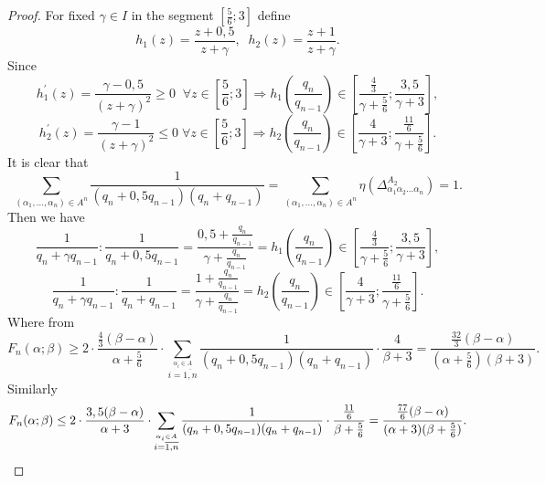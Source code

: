 \documentclass[11pt]{amsart}
\theoremstyle{plain}
\theoremstyle{remark}
\begin{document}
\begin{proof}
   For fixed $\gamma \in I$ in the segment $[\frac{5}{6};3]$ define
    $$h_{1}(z)=\frac{z+0,5}{z+\gamma},\;\;  h_{2}(z)=\frac{z+1}{z+\gamma}.$$
   Since
   $$h_{1}^\prime(z)=\frac{\gamma-0,5}{(z+\gamma)^2}\geq 0\;\; \forall z\in [\frac{5}{6};3]  \Rightarrow   h_{1}(\frac{q_{n}}{q_{n-1}})\in\left[\frac{ \frac{4}{3}}{\gamma+\frac{5}{6}};\frac{3,5}{\gamma+3}\right],$$
    $$h_{2}^\prime(z)=\frac{\gamma-1}{(z+\gamma)^2}\leq 0\; \forall z\in [\frac{5}{6};3] \Rightarrow   h_{2}(\frac{q_{n}}{q_{n-1}})\in\left[\frac{4}{\gamma+3};\frac{\frac{11}{6}}{\gamma+\frac{5}{6}}\right].$$
   It is clear that
    $$\sum_{(\alpha_1,...,\alpha_n)\in A^n}\frac{1}{(q_n+0,5q_{n-1})(q_n+q_{n-1})}=\sum_{(\alpha_1,...,\alpha_n)\in A^n}\eta(\Delta^{A_2}_{\alpha_1\alpha_2...\alpha_n})=1.$$
   Then we have
   $$
   \frac{1}{q_n+\gamma q_{n-1}}: \frac{1}{q_n+0,5 q_{n-1}}=\frac{0,5+\frac{q_{n}}{q_{n-1}}}{\gamma+\frac{q_{n}}{q_{n-1}}}=h_{1}\left(\frac{q_{n}}{q_{n-1}}\right)
    \in\left[\frac{ \frac{4}{3}}{\gamma+\frac{5}{6}};\frac{3,5}{\gamma+3}\right],
   $$
   $$
   \frac{1}{q_n+\gamma q_{n-1}}:\frac{1}{q_n+q_{n-1}}=\frac{1+\frac{q_{n}}{q_{n-1}}}{\gamma+\frac{q_{n}}{q_{n-1}}}=h_{2}\left(\frac{q_{n}}{q_{n-1}}\right)
   \in\left[\frac{4}{\gamma+3};\frac{\frac{11}{6}}{\gamma+\frac{5}{6}}\right].
   $$
   Where from
   \[
   F_n(\alpha;\beta)\geq 2\cdot\frac{ \frac{4}{3}(\beta-\alpha)}{\alpha+\frac{5}{6}}\cdot\sum_{\stackrel{\alpha_i\in A}{i=\overline{1,n}}}\frac{1}{(q_n+0,5q_{n-1})(q_n+q_{n-1})}\cdot\frac{4}{\beta+3}=\frac{\frac{32}{3}(\beta-\alpha)}{(\alpha+\frac{5}{6})(\beta+3)}.
\]
     Similarly
    \[
   F_n(\alpha;\beta)\leq 2\cdot\frac{3,5(\beta-\alpha)}{\alpha+3}\cdot\sum_{\stackrel{\alpha_i\in A}{i=\overline{1,n}}}\frac{1}{(q_n+0,5q_{n-1})(q_n+q_{n-1})}\cdot\frac{\frac{11}{6}}{\beta+\frac{5}{6}}=
   \frac{\frac{77}{6}(\beta-\alpha)}{(\alpha+3)(\beta+\frac{5}{6})}.
   \qedhere\]
 \end{proof}
\end{document}
